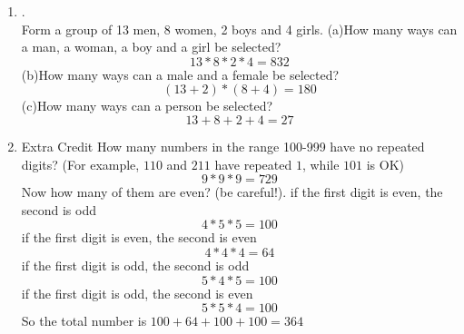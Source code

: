\documentclass{article}
\theoremstyle{definition}
\theoremstyle{plain}
\begin{document}
\begin {enumerate}[itemindent=30pt,label=\bf Exercise {\arabic*}:]
\begin{center}
\end{center}
\subitem So there are $13$ strings of length four with no three consecutive $0$s.
\item .\\Form a group of 13 men, 8 women, 2 boys and 4 girls.
\subitem (a)How many ways can a man, a woman, a boy and a girl be selected? $$13*8*2*4 = 832$$
\subitem (b)How many ways can a male and a female be selected?
$$(13+2)*(8+4) = 180$$
\subitem (c)How many ways can a person be selected?
$$13+8+2+4 = 27$$
\item Extra Credit
\subitem How many numbers in the range 100-999 have no repeated digits? (For example, $110$ and $211$ have repeated $1$, while $101$ is OK) $$9*9*9 = 729$$
\subitem Now how many of them are even? (be careful!).
\subitem \qquad if the first digit is even, the second is odd $$4*5*5 = 100$$
\subitem \qquad if the first digit is even, the second is even $$4*4*4 = 64$$
\subitem \qquad if the first digit is odd, the second is odd $$5*4*5 = 100$$
\subitem \qquad if the first digit is odd, the second is even $$5*5*4 = 100$$
\subitem \qquad So the total number is $100+64+100+100 = 364$
\end{enumerate}
\end{document}
